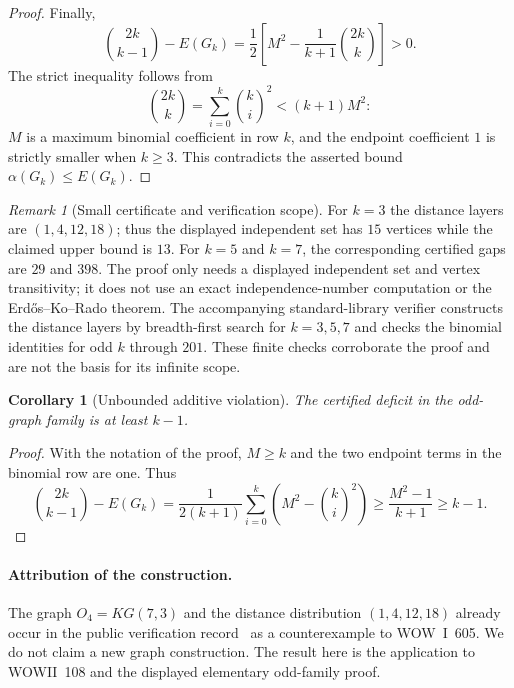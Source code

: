 \documentclass[11pt,a4paper]{article}
\newtheorem{corollary}[theorem]{Corollary}
\theoremstyle{remark}
\newtheorem{remark}[theorem]{Remark}
\begin{document}
\begin{proof}
Finally,
\[
 \binom{2k}{k-1}-E(G_k)
  =\frac12\left[M^2-\frac{1}{k+1}\binom{2k}{k}\right]>0.
\]
The strict inequality follows from
\[
 \binom{2k}{k}=\sum_{i=0}^{k}\binom{k}{i}^2<(k+1)M^2:
\]
$M$ is a maximum binomial coefficient in row $k$, and the endpoint
coefficient $1$ is strictly smaller when $k\ge3$.  This contradicts
the asserted bound $\alpha(G_k)\le E(G_k)$.
\end{proof}

\begin{remark}[Small certificate and verification scope]
For $k=3$ the distance layers are $(1,4,12,18)$; thus the displayed
independent set has $15$ vertices while the claimed upper bound is $13$.
For $k=5$ and $k=7$, the corresponding certified gaps are $29$ and $398$.
The proof only needs a displayed independent set and vertex transitivity;
it does not use an exact independence-number computation or the
Erd\H{o}s--Ko--Rado theorem.  The accompanying standard-library verifier
constructs the distance layers by breadth-first search for $k=3,5,7$ and
checks the binomial identities for odd $k$ through $201$.  These finite
checks corroborate the proof and are not the basis for its infinite scope.
\end{remark}

\begin{corollary}[Unbounded additive violation]
The certified deficit in the odd-graph family is at least $k-1$.
\end{corollary}
\begin{proof}
With the notation of the proof, $M\ge k$ and the two endpoint terms
in the binomial row are one. Thus
\[
 \binom{2k}{k-1}-E(G_k)
 =\frac{1}{2(k+1)}\sum_{i=0}^{k}
       \left(M^2-\binom{k}{i}^2\right)
 \ge\frac{M^2-1}{k+1}\ge k-1.
\]
\end{proof}

\paragraph{Attribution of the construction.}
The graph $O_4=KG(7,3)$ and the distance distribution $(1,4,12,18)$
already occur in the public verification record~\cite[\S7h]{AuditR8}
as a counterexample to WOW~I~605. We do not claim a new graph
construction. The result here is the application to WOWII~108 and
the displayed elementary odd-family proof.

\end{document}

